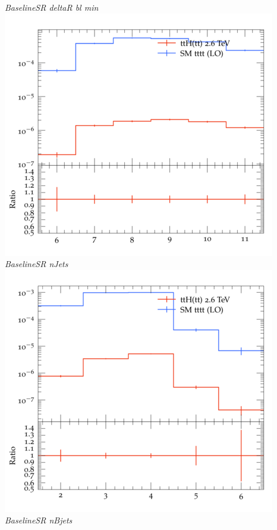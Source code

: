 \documentclass{beamer}
\begin{document}
\begin{frame}
\begin{columns}
\textit{\small BaselineSR deltaR bl min}
\includegraphics[width=\textwidth]{../plots/ttH_2600/tttt_ttH_1LOS/BaselineSR_nJets.png}\\
\textit{\small BaselineSR nJets}
\includegraphics[width=\textwidth]{../plots/ttH_2600/tttt_ttH_1LOS/BaselineSR_nBjets.png}\\
\textit{\small BaselineSR nBjets}
\end{columns}
\end{frame}
\end{document}
